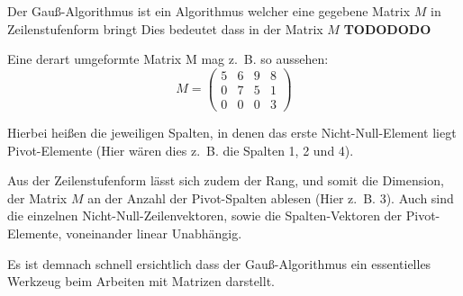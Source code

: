 Der Gauß-Algorithmus ist ein Algorithmus welcher eine gegebene Matrix $M$ in Zeilenstufenform bringt
Dies bedeutet dass in der Matrix $M$
\textbf{TODODODO}

Eine derart umgeformte Matrix M mag z.~B. so aussehen:
\[ M = \begin{pmatrix}
5 & 6 & 9 & 8\\ 
0 & 7 & 5 & 1\\ 
0 & 0 & 0 & 3
\end{pmatrix} \]

Hierbei heißen die jeweiligen Spalten, in denen das erste Nicht-Null-Element liegt Pivot-Elemente (Hier wären dies z.~B. die Spalten 1, 2 und 4).

Aus der Zeilenstufenform lässt sich zudem der Rang, und somit die Dimension, der Matrix $M$ an der Anzahl der Pivot-Spalten ablesen (Hier z.~B. 3).
Auch sind die einzelnen Nicht-Null-Zeilenvektoren, sowie die Spalten-Vektoren der Pivot-Elemente, voneinander linear Unabhängig.

Es ist demnach schnell ersichtlich dass der Gauß-Algorithmus ein essentielles Werkzeug beim Arbeiten mit Matrizen darstellt.